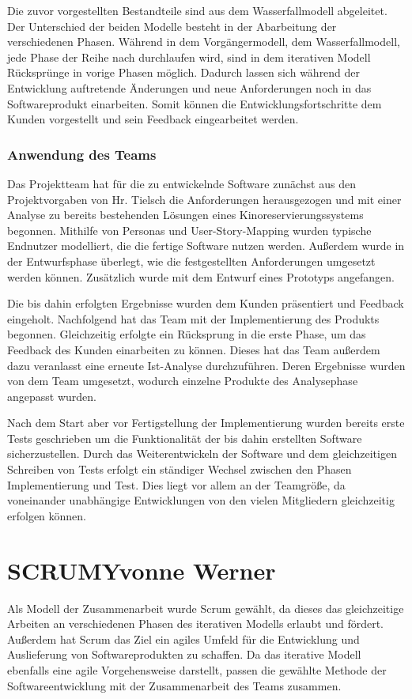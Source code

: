 Die zuvor vorgestellten Bestandteile sind aus dem Wasserfallmodell abgeleitet. Der Unterschied der beiden Modelle besteht in der Abarbeitung der verschiedenen Phasen. Während in dem Vorgängermodell, dem Wasserfallmodell, jede Phase der Reihe nach durchlaufen wird, sind in dem iterativen Modell Rücksprünge in vorige Phasen möglich. Dadurch lassen sich während der Entwicklung auftretende Änderungen und neue Anforderungen noch in das Softwareprodukt einarbeiten. Somit können die Entwicklungsfortschritte dem Kunden vorgestellt und sein Feedback eingearbeitet werden. 

\subsubsection{Anwendung des Teams}
Das Projektteam hat für die zu entwickelnde Software zunächst aus den Projektvorgaben von Hr. Tielsch die Anforderungen herausgezogen und mit einer Analyse zu bereits bestehenden Lösungen eines Kinoreservierungssystems begonnen. Mithilfe von Personas und User-Story-Mapping wurden typische Endnutzer modelliert, die die fertige Software nutzen werden. Außerdem wurde in der Entwurfsphase überlegt, wie die festgestellten Anforderungen umgesetzt werden können. Zusätzlich wurde mit dem Entwurf eines Prototyps angefangen. 

Die bis dahin erfolgten Ergebnisse wurden dem Kunden präsentiert und Feedback eingeholt. Nachfolgend hat das Team mit der Implementierung des Produkts begonnen. Gleichzeitig erfolgte ein Rücksprung in die erste Phase, um das Feedback des Kunden einarbeiten zu können. Dieses hat das Team außerdem dazu veranlasst eine erneute Ist-Analyse durchzuführen. Deren Ergebnisse wurden von dem Team umgesetzt, wodurch einzelne Produkte des Analysephase angepasst wurden. 

Nach dem Start aber vor Fertigstellung der Implementierung wurden bereits erste Tests geschrieben um die Funktionalität der bis dahin erstellten Software sicherzustellen. Durch das Weiterentwickeln der Software und dem gleichzeitigen Schreiben von Tests erfolgt ein ständiger Wechsel zwischen den Phasen Implementierung und Test. Dies liegt vor allem an der Teamgröße, da voneinander unabhängige Entwicklungen von den vielen Mitgliedern gleichzeitig erfolgen können. 
 
\section[SCRUM]{SCRUM{\hfill \normalsize Yvonne Werner}} \label{chapter:SCRUM}
Als Modell der Zusammenarbeit wurde Scrum gewählt, da dieses das gleichzeitige Arbeiten an verschiedenen Phasen des iterativen Modells erlaubt und fördert. Außerdem hat Scrum das Ziel ein agiles Umfeld für die Entwicklung und Auslieferung von Softwareprodukten zu schaffen. Da das iterative Modell ebenfalls eine agile Vorgehensweise darstellt, passen die gewählte Methode der Softwareentwicklung mit der Zusammenarbeit des Teams zusammen. 

